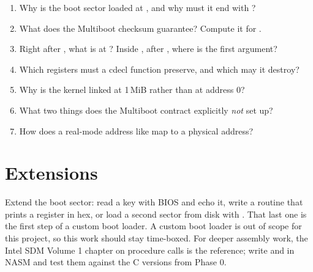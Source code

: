 \documentclass[11pt,a4paper]{article}
\begin{document}
\begin{questionbox}
\begin{enumerate}
  \item Why is the boot sector loaded at , and why must it end with ?
  \item What does the Multiboot checksum guarantee? Compute it for .
  \item Right after , what is at \code{[esp]}? Inside , after , where is the first argument?
  \item Which registers must a cdecl function preserve, and which may it destroy?
  \item Why is the kernel linked at 1\,MiB rather than at address 0?
  \item What two things does the Multiboot contract explicitly \emph{not} set up?
  \item How does a real-mode address like  map to a physical address?
\end{enumerate}
\end{questionbox}

\section{Extensions}

Extend the boot sector: read a key with BIOS  and echo it, write a routine that prints a register in
hex, or load a second sector from disk with . That last one is the first step of a custom boot loader.
A custom boot loader is out of scope for this project, so this work should stay time-boxed. For deeper assembly
work, the Intel SDM Volume 1 chapter on procedure calls is the reference; write  and  in NASM
and test them against the C versions from Phase 0.

\booklegend
\end{document}
